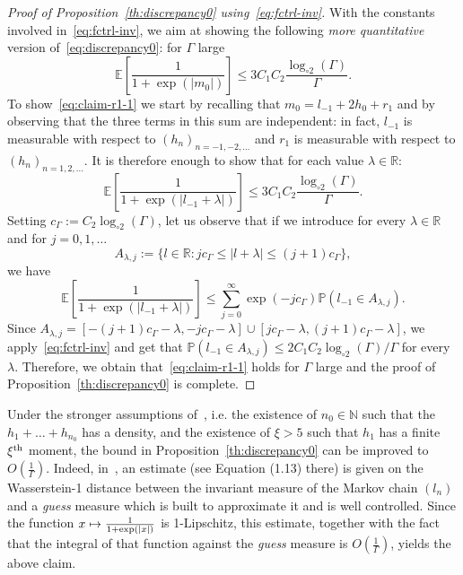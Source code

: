 \documentclass[AHL,Unicode,longabstracts,published]{cedram}
\newcommand{\N}{\mathbb{N}}
\newcommand{\bbE}{\mathbb{E}}
\newcommand{\bbP}{\mathbb{P}}
\newcommand{\bbR}{\mathbb{R}}
\newcommand{\gG}{\Gamma}
\newcommand{\loglog}{\log_{\circ 2}}
\let\oldmapsto\mapsto
\renewcommand*{\mapsto}{\mathchoice{\longmapsto}{\oldmapsto}{\oldmapsto}{\oldmapsto}}
\begin{document}
\begin{proof}[Proof of Proposition~\ref{th:discrepancy0} using~\eqref{eq:fctrl-inv}]
With the constants involved in~\eqref{eq:fctrl-inv}, we aim at showing the following \emph{more quantitative} version of~\eqref{eq:discrepancy0}: for $\gG$ large
\begin{equation}\label{eq:claim-r1-1}
\bbE \left[
\frac {1} {1+ \exp\left(\left| m_0\right|\right)}
\right]\le 3C_1 C_2 \frac {\loglog (\gG)} \gG.
\end{equation}
To show~\eqref{eq:claim-r1-1} we start by recalling that $m_0=l_{-1}+2h_0+r_1$ and by observing that the three terms in this sum are independent: in fact, $l_{-1}$ is measurable with respect to $(h_{n})_{n=-1, -2, \dots}$ and $r_1$ is measurable with respect to $(h_n)_{n=1,2, \dots}$. It is therefore enough to show that for each value $\lambda\in\bbR$:
\begin{equation}
\bbE \left[
\frac {1} {1+ \exp\left(\left| l_{-1}+\lambda\right|\right)}
\right]\le 3C_1 C_2 \frac {\loglog (\gG)} \gG.
\end{equation}
Setting $c_\gG:= C_2 \loglog(\gG)$, let us observe that if we introduce for every $\lambda\in \bbR$ and for $j=0,1, \dots$
\begin{equation}
A_{\lambda, j}:= \bigl\{l\in\bbR: j c_\gG \le | l+\lambda | \le (j+1) c_\gG \bigr\},
\end{equation}
we have
\begin{equation}
\bbE \left[
\frac {1} {1+ \exp\left(\left| l_{-1}+\lambda\right|\right)}
\right]\le
\sum_{j =0}^\infty \exp\left(-j c_\gG\right) \bbP\left(l_{-1} \in A_{\lambda, j} \right).
\end{equation}
Since $A_{\lambda, j}= [- (j+1)c_\gG -\lambda, - jc_\gG -\lambda]\cup [jc_\gG -\lambda, (j+1)c_\gG -\lambda]$, { we apply~\eqref{eq:fctrl-inv} and get that $\bbP(l_{-1} \in A_{\lambda, j})\le 2C_1 C_2 \loglog (\gG)/ \gG $ for every $\lambda$.} Therefore, we obtain that~\eqref{eq:claim-r1-1} holds for $\gG$ large and the proof of Proposition~\ref{th:discrepancy0} is complete.
\end{proof}

\begin{rema}
Under the stronger assumptions of~\cite{cf:CGGH}, i.e. the existence of $n_0\in \N$ such that the $h_1+\dots +h_{n_0}$ has a density, and the existence of $\xi>5$ such that $h_1$ has a finite $\xi^{\rm th}$ moment, the bound in Proposition~\ref{th:discrepancy0} can be improved to $O(\frac{1}{\gG})$. Indeed, in~\cite{cf:CGGH}, an estimate (see Equation (1.13) there) is given on the Wasserstein-1 distance between the invariant measure of the Markov chain $(l_n)$ and a \emph{guess} measure which is built to approximate it and is well controlled. Since the function $x\mapsto \frac{1}{1+\exp(|x|)}$ is 1-Lipschitz, this estimate, together with the fact that the integral of that function against the \emph{guess} measure is $O(\frac{1}{\gG})$, yields the above claim.
\end{rema}
\end{document}
